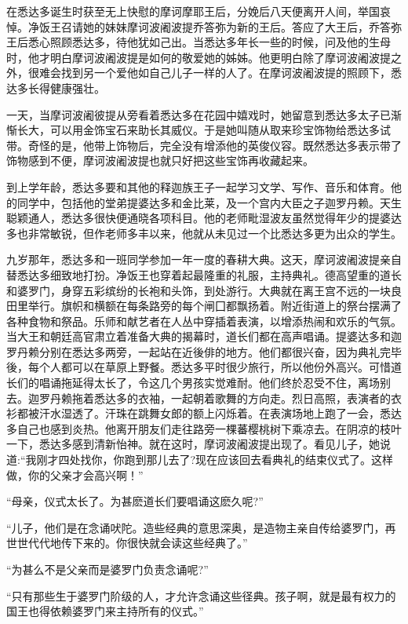 \documentclass[12pt,twoside,openany]{book}
\begin{document}
在悉达多诞生时获至无上快慰的摩诃摩耶王后，分娩后八天便离开人间，举国哀悼。净饭王召请她的妹妹摩诃波阇波提乔答弥为新的王后。答应了大王后，乔答弥王后悉心照顾悉达多，待他犹如己出。当悉达多年长一些的时候，问及他的生母时，他才明白摩诃波阇波提是如何的敬爱她的姊姊。他更明白除了摩诃波阇波提之外，很难会找到另一个爱他如自己儿子一样的人了。在摩诃波阇波提的照顾下，悉达多长得健康强壮。

一天，当摩诃波阇彼提从旁看着悉达多在花园中嬉戏时，她留意到悉达多太子已渐惭长大，可以用金饰宝石来助长其威仪。于是她叫随从取来珍宝饰物给悉达多试带。奇怪的是，他带上饰物后，完全没有增添他的英俊仪容。既然悉达多表示带了饰物感到不便，摩诃波阇波提也就只好把这些宝饰再收藏起来。

到上学年龄，悉达多要和其他的释迦族王子一起学习文学、写作、音乐和体育。他的同学中，包括他的堂弟提婆达多和金比莱，及一个宫内大臣之子迦罗丹赖。天生聪颖通人，悉达多很快便通晓各项科目。他的老师毗湿波友虽然觉得年少的提婆达多也非常敏锐，但作老师多丰以来，他就从未见过一个比悉达多更为出众的学生。

九岁那年，悉达多和一班同学参加一年一度的春耕大典。这天，摩诃波阇波提亲自替悉达多细致地打扮。净饭王也穿着起最隆重的礼服，主持典礼。德高望重的道长和婆罗门，身穿五彩缤纷的长袍和头饰，到处游行。大典就在离王宫不远的一块良田里举行。旗帜和横额在每条路旁的每个闸囗都飘扬着。附近街道上的祭台摆满了各种食物和祭品。乐师和献艺者在人丛中穿插着表演，以增添热闹和欢乐的气氛。当大王和朝廷高官肃立着准备大典的揭幕时，道长们都在高声唱诵。提婆达多和迦罗丹赖分别在悉达多两旁，一起站在近後俳的地方。他们都很兴奋，因为典礼完毕後，每个人都可以在草原上野餐。悉达多平时很少旅行，所以他份外高兴。可惜道长们的唱诵拖延得太长了，令这几个男孩实觉难耐。他们终於忍受不住，离场别去。迦罗丹赖拖着悉达多的衣袖，一起朝着歌舞的方向走。烈日高照，表演者的衣衫都被汗水湿透了。汗珠在跳舞女郎的额上闪烁着。在表演场地上跑了一会，悉达多自己也感到炎热。他离开朋友们走往路旁一棵蕃樱桃树下乘凉去。在阴凉的枝叶一下，悉达多感到清新怡神。就在这时，摩诃波阇波提出现了。看见儿子，她说道:“我刚才四处找你，你跑到那儿去了?现在应该回去看典礼的结束仪式了。这样做，你的父亲才会高兴啊！”

“母亲，仪式太长了。为甚麽道长们要唱诵这麽久呢?”

“儿子，他们是在念诵吠陀。造些经典的意思深奥，是造物主亲自传给婆罗门，再世世代代地传下来的。你很快就会读这些经典了。”

“为甚么不是父亲而是婆罗门负责念诵呢?”

“只有那些生于婆罗门阶级的人，才允许念诵这些径典。孩子啊，就是最有权力的国王也得依赖婆罗门来主持所有的仪式。”
\end{document}
